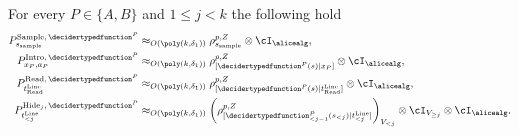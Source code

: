 \begin{claim} \label{claim:QRsoundZmeasure}
	For every $P \in \{A,B\}$ and $1 \leq j < k$ the following hold
	\begin{align}
		\label{eq:QRproofZ-1} P^{\text{Sample}, \, \decidertypedfunction^P}_{s_{\text{sample}}} &\approx_{O(\poly(k, \delta_1))}  \rho^{p,Z}_{s_{\text{sample}}} \otimes \cI_{\alicealg}, \\
		\label{eq:QRproofZ-2} P^{\text{Intro}, \, \decidertypedfunction^P}_{x_P, a_P}   &\approx_{O(\poly(k, \delta_1))}  \rho^{p,Z}_{[\decidertypedfunction^P(s)| x_P]}  \otimes \cI_{\alicealg}, \\
		\label{eq:QRproofZ-3} P^{\text{Read}, \, \decidertypedfunction^P}_{t_{\text{Read}}^{\text{Line}}} &\approx_{O(\poly(k, \delta_1))}  \rho^{p,Z}_{[\decidertypedfunction^P(s)| t_{\text{Read}}^{\text{Line}}]} \otimes \cI_{\alicealg}, \\
		\label{eq:QRproofZ-4} P^{\text{Hide}_j, \, \decidertypedfunction^P}_{t_{< j}^{\text{Line}}} &\approx_{O(\poly(k, \delta_1))} \left(\rho^{p,Z}_{[\decidertypedfunction^P_{< j-1}(s_{< j})| t_{< j}^{\text{Line}}]}\right)_{V_{< j}} \otimes \cI_{V_{\geq j}} \otimes \cI_{\alicealg}.  
	\end{align}

\end{claim}

